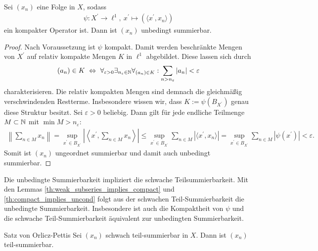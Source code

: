 \begin{lem}\label{th:compact_implies_uncond}
	Sei $ (x_n) $ eine Folge in $ X $, sodass
	\begin{align*}
		\psi  :  X^\prime \to \ell^1, \
		x^\prime \mapsto (\langle x^\prime , x_n \rangle)
	\end{align*}
	ein kompakter Operator ist.
	Dann ist $ (x_n) $ unbedingt summierbar.
\end{lem}
\newpage
\begin{proof}
	Nach Voraussetzung ist $ \psi $ kompakt. Damit werden beschränkte Mengen von $ X^\prime $ auf relativ kompakte Mengen $ K $ in $ \ell^1 $ abgebildet.
	Diese lassen sich durch
	\begin{align*}
		\textcolor{black}{(a_n) \in K
			\ \Leftrightarrow \
			\forall_{\varepsilon  > 0}
			\exists_{n_\varepsilon \in \mathbb{N}}
			\forall_{(a_n) \in K} :	
			\sum \limits_{n > n_\varepsilon}
			| a_n |
			< \varepsilon}
	\end{align*}
	charakterisieren. Die relativ kompakten Mengen sind demnach die gleichmäßig verschwindenden Restterme.
	Insbesondere wissen wir, dass $ K :=  \psi(B_{X^\prime}) $ genau diese Struktur besitzt.
	Sei $  \varepsilon > 0 $ beliebig. Dann gilt für jede endliche Teilmenge $ M \subset \mathbb{N} $
	mit $ \min M > n_\varepsilon $:
	\begin{align*}
		\left\|
		\sum \limits_{n \in M } x_n 
		\right\|
		=
		\sup \limits_{x^\prime \in B_{X^\prime} }
		\left|\left\langle 
		x^\prime , \sum \limits_{n \in M } x_n 
		\right\rangle\right|
		\leq 
		\sup \limits_{x^\prime \in B_{X^\prime}}
		\sum \limits_{n \in M } | \langle x^\prime , x_n \rangle |
		=
		\sup \limits_{x^\prime \in B_{X^\prime}}
		\sum \limits_{n \in M } | \psi(x^\prime) | < \varepsilon.
	\end{align*}
Somit ist $ (x_n) $ ungeordnet summierbar und damit auch unbedingt summierbar.
\end{proof}


Die unbedingte Summierbarkeit impliziert die schwache Teilsummierbarkeit. 
Mit den Lemmas \ref{th:weak_subseries_implies_compact} und \ref{th:compact_implies_uncond} folgt aus der schwachen Teil-Summierbarkeit die unbedingte Summierbarkeit.
Insbesondere ist auch die Kompaktheit von $ \psi $
und die schwache Teil-Summierbarkeit äquivalent zur unbedingten Summierbarkeit.

\begin{genericthm}{Satz von Orlicz-Pettis}\label{th:orlicz_pettis}
	Sei $ (x_n) $ schwach teil-summierbar in $ X $.
	Dann ist $ (x_n) $ teil-summierbar.
\end{genericthm}

